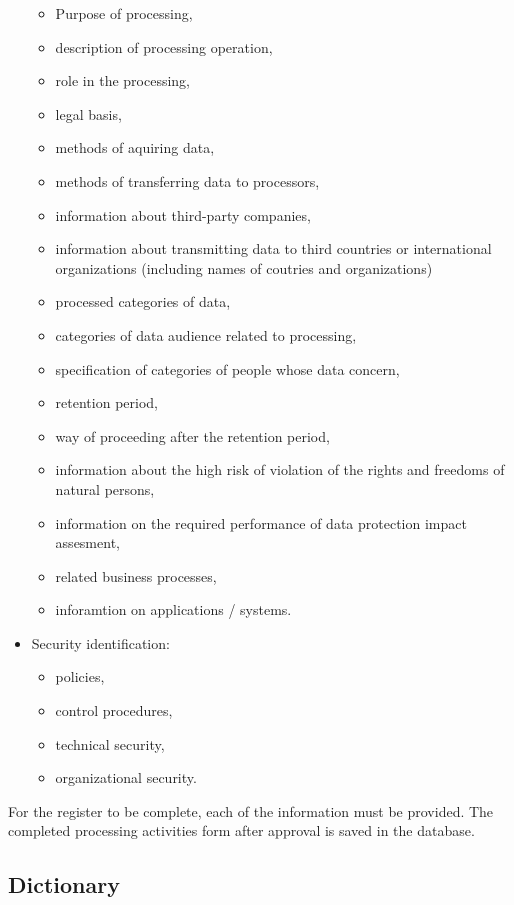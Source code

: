 \documentclass[en, noamssymb]{mgr}
\begin{document}
\begin{itemize}
\begin{itemize}
\item Purpose of processing,
\item description of processing operation,
\item role in the processing,
\item legal basis,
\item methods of aquiring data,
\item methods of transferring data to processors,
\item information about third-party companies,
\item information about transmitting data to third countries or international organizations (including names of coutries and organizations)
\item processed categories of data,
\item categories of data audience related to processing,
\item specification of categories of people whose data concern,
\item retention period,
\item way of proceeding after the retention period,
\item information about the high risk of violation of the rights and freedoms of natural persons,
\item information on the required performance of data protection impact assesment,
\item related business processes,
\item inforamtion on applications / systems.

\end{itemize}

\item Security identification:

\begin{itemize}

\item policies,
\item control procedures,
\item technical security,
\item organizational security.

\end{itemize}

\end{itemize}

For the register to be complete, each of the information must be provided. The completed processing activities form after approval is saved in the database.

\subsection{Dictionary}
\end{document}
